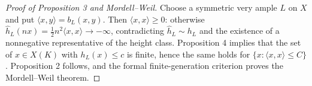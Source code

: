\begin{proof}[Proof of Proposition 3 and Mordell--Weil]
Choose a symmetric very ample $L$ on $X$ and put
$\langle x,y\rangle=b_L(x,y)$. Then $\langle x,x\rangle\ge0$: otherwise
$\widehat h_L(nx)=\frac12n^2\langle x,x\rangle\to-\infty$, contradicting
$\widehat h_L\sim h_L$ and the existence of a nonnegative representative of
the height class. Proposition 4 implies that the set of $x\in X(K)$ with
$h_L(x)\le c$ is finite, hence the same holds for
$\{x:\langle x,x\rangle\le C\}$. Proposition 2 follows, and the formal
finite-generation criterion proves the Mordell--Weil theorem.
\end{proof}
